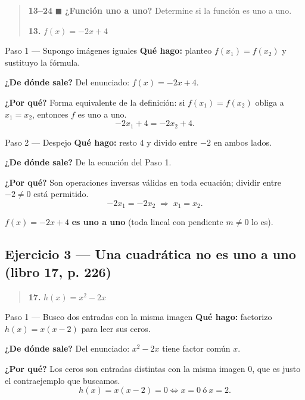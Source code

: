 \documentclass[11pt]{article}
\begin{document}
\begin{quote}
\textbf{13--24} $\blacksquare$ \textbf{¿Función uno a uno?} Determine si la función es uno a uno.

\textbf{13.} $f(x)=-2x+4$
\end{quote}

\begin{paso}{Paso 1 --- Supongo imágenes iguales}
\textbf{Qué hago:} planteo $f(x_1)=f(x_2)$ y sustituyo la fórmula.

\textbf{¿De dónde sale?} Del enunciado: $f(x)=-2x+4$.

\textbf{¿Por qué?} Forma equivalente de la definición: si $f(x_1)=f(x_2)$ obliga a $x_1=x_2$, entonces $f$ es uno a uno.
\[
-2x_1+4=-2x_2+4.
\]
\end{paso}

\begin{paso}{Paso 2 --- Despejo}
\textbf{Qué hago:} resto $4$ y divido entre $-2$ en ambos lados.

\textbf{¿De dónde sale?} De la ecuación del Paso 1.

\textbf{¿Por qué?} Son operaciones inversas válidas en toda ecuación; dividir entre $-2\neq 0$ está permitido.
\[
-2x_1=-2x_2 \;\Longrightarrow\; x_1=x_2.
\]
\end{paso}

\begin{resp}
$f(x)=-2x+4$ \textbf{es uno a uno} (toda lineal con pendiente $m\neq 0$ lo es).
\end{resp}

\subsection*{Ejercicio 3 --- Una cuadrática no es uno a uno (libro 17, p. 226)}

\begin{quote}
\textbf{17.} $h(x)=x^2-2x$
\end{quote}

\begin{paso}{Paso 1 --- Busco dos entradas con la misma imagen}
\textbf{Qué hago:} factorizo $h(x)=x(x-2)$ para leer sus ceros.

\textbf{¿De dónde sale?} Del enunciado: $x^2-2x$ tiene factor común $x$.

\textbf{¿Por qué?} Los ceros son entradas distintas con la misma imagen $0$, que es justo el contraejemplo que buscamos.
\[
h(x)=x(x-2)=0 \iff x=0 \ \text{ó}\ x=2.
\]
\end{paso}
\end{document}
